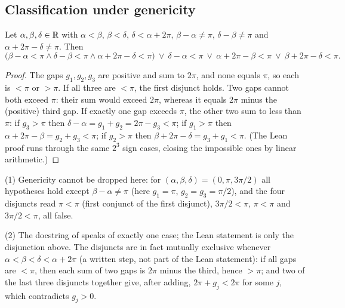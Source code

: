 \subsection{Classification under genericity}

\begin{proposition}\label{pc:prop:gaps}
Let $\alpha,\beta,\delta\in\mathbb R$ with $\alpha<\beta$, $\beta<\delta$, $\delta<\alpha+2\pi$, $\beta-\alpha\neq\pi$,
$\delta-\beta\neq\pi$ and $\alpha+2\pi-\delta\neq\pi$. Then
\[
  \bigl(\beta-\alpha<\pi\wedge\delta-\beta<\pi\wedge\alpha+2\pi-\delta<\pi\bigr)\ \vee\ \delta-\alpha<\pi\ \vee\
  \alpha+2\pi-\beta<\pi\ \vee\ \beta+2\pi-\delta<\pi .
\]
\end{proposition}

\begin{proof}
The gaps $g_1,g_2,g_3$ are positive and sum to $2\pi$, and none equals $\pi$, so each is $<\pi$ or $>\pi$. If all
three are $<\pi$, the first disjunct holds. Two gaps cannot both exceed $\pi$: their sum would exceed $2\pi$,
whereas it equals $2\pi$ minus the (positive) third gap. If exactly one gap exceeds $\pi$, the other two sum to
less than $\pi$: if $g_3>\pi$ then $\delta-\alpha=g_1+g_2=2\pi-g_3<\pi$; if $g_1>\pi$ then
$\alpha+2\pi-\beta=g_2+g_3<\pi$; if $g_2>\pi$ then $\beta+2\pi-\delta=g_3+g_1<\pi$. (The Lean proof runs through
the same $2^3$ sign cases, closing the impossible ones by linear arithmetic.)
\end{proof}

\begin{remark}[boundary cases and exclusivity]\label{pc:rem:gaps}
(1) Genericity cannot be dropped here: for $(\alpha,\beta,\delta)=(0,\pi,3\pi/2)$ all hypotheses hold except
$\beta-\alpha\neq\pi$ (here $g_1=\pi$, $g_2=g_3=\pi/2$), and the four disjuncts read $\pi<\pi$ (first conjunct of the first disjunct), $3\pi/2<\pi$, $\pi<\pi$ and $3\pi/2<\pi$, all
false.

(2) The docstring of  speaks of exactly one case; the Lean statement is only the
disjunction above. The disjuncts are in fact mutually exclusive whenever $\alpha<\beta<\delta<\alpha+2\pi$ (a
written step, not part of the Lean statement): if all gaps are $<\pi$, then each sum of two gaps is
$2\pi$ minus the third, hence $>\pi$; and two of the last three disjuncts together give, after adding,
$2\pi+g_j<2\pi$ for some $j$, which contradicts $g_j>0$.
\end{remark}

